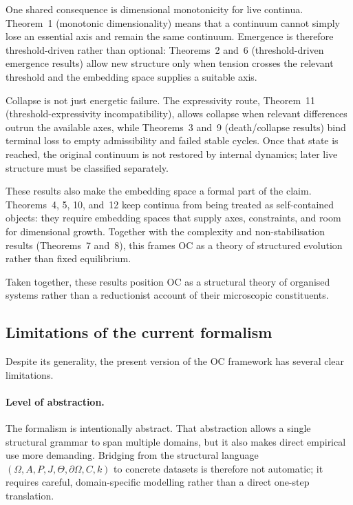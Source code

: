 One shared consequence is dimensional monotonicity for live continua.
Theorem~1 (monotonic dimensionality) means that a
continuum cannot simply lose an essential axis and remain the same continuum.
Emergence is therefore threshold-driven rather than optional:
Theorems~2 and~6 (threshold-driven emergence results)
allow new structure only when tension crosses the relevant threshold and the
embedding space supplies a suitable axis.

Collapse is not just energetic failure. The
expressivity route, Theorem~11 (threshold-expressivity incompatibility),
allows collapse when relevant differences
outrun the available axes, while Theorems~3 and~9 (death/collapse results) bind
terminal loss to empty admissibility and failed stable cycles. Once that state
is reached, the original continuum is not restored by internal dynamics; later
live structure must be classified separately.

These results also make the embedding space a formal part of the
claim. Theorems~4, 5, 10, and~12 keep continua from being treated as
self-contained objects: they require embedding spaces that supply axes,
constraints, and room for dimensional growth. Together with the complexity and
non-stabilisation results (Theorems~7 and~8), this frames OC as a theory of
structured evolution rather than fixed equilibrium.

Taken together, these results position OC as a structural theory of organised systems rather than a reductionist account of their microscopic constituents.

\subsection{Limitations of the current formalism}

Despite its generality, the present version of the OC framework has several clear limitations.

\paragraph{Level of abstraction.}
The formalism is intentionally abstract. That abstraction allows a single structural grammar to span
multiple domains, but it also makes direct empirical use more demanding. Bridging from the
structural language \((\Omega,A,P,J,\Theta,\partial\Omega,C,k)\) to concrete datasets is therefore
not automatic; it requires careful, domain-specific modelling rather than a direct one-step
translation.

